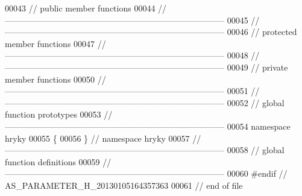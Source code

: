 \begin{DoxyCode}
00043 \textcolor{comment}{// public member functions}
00044 \textcolor{comment}{//
      ------------------------------------------------------------------------------}
00045 \textcolor{comment}{//
      ------------------------------------------------------------------------------}
00046 \textcolor{comment}{// protected member functions}
00047 \textcolor{comment}{//
      ------------------------------------------------------------------------------}
00048 \textcolor{comment}{//
      ------------------------------------------------------------------------------}
00049 \textcolor{comment}{// private member functions}
00050 \textcolor{comment}{//
      ------------------------------------------------------------------------------}
00051 \textcolor{comment}{//
      ------------------------------------------------------------------------------}
00052 \textcolor{comment}{// global function prototypes}
00053 \textcolor{comment}{//
      ------------------------------------------------------------------------------}
00054 \textcolor{keyword}{namespace }hryky
00055 \{
00056 \} \textcolor{comment}{// namespace hryky}
00057 \textcolor{comment}{//
      ------------------------------------------------------------------------------}
00058 \textcolor{comment}{// global function definitions}
00059 \textcolor{comment}{//
      ------------------------------------------------------------------------------}
00060 \textcolor{preprocessor}{#endif // AS\_PARAMETER\_H\_20130105164357363}
00061 \textcolor{preprocessor}{}\textcolor{comment}{// end of file}
\end{DoxyCode}
